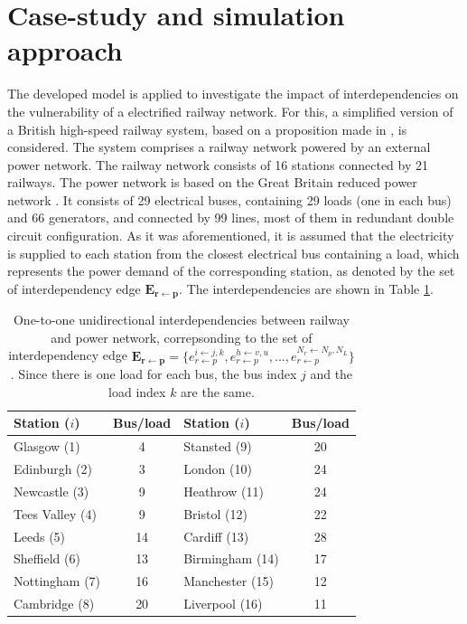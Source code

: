 \documentclass[review]{elsarticle}
\begin{document}
	\section{Case-study and simulation approach}
	The developed model is applied to investigate the impact of interdependencies on the vulnerability of a electrified railway network. For this, a simplified version of a British high-speed railway system, based on a proposition made in \cite{greengauge2009fast}, is considered. The system comprises a railway network powered by an external power network. The railway network consists of 16 stations connected by 21 railways. The power network is based on the Great Britain reduced power network \cite{bukhsh2013network}. It consists of 29 electrical buses, containing 29 loads (one in each bus) and 66 generators, and connected by 99 lines, most of them in redundant double circuit configuration. As it was aforementioned, it is assumed that the electricity is supplied to each station from the closest electrical bus containing a load, which represents the power demand of the corresponding station, as denoted by the set of interdependency edge $\mathbf{E_{r \leftarrow p}}$. The interdependencies are shown in Table \ref{interdependencies}.
	\begin{table}[h]
		\centering
		\caption{One-to-one unidirectional interdependencies between railway and power network, correpsonding to the set of interdependency edge $\mathbf{E_{r \leftarrow p}}=\{ e_{r \leftarrow p}^{i \leftarrow j,k}, e_{r \leftarrow p}^{h \leftarrow v,u},...,e_{r \leftarrow p}^{N_r \leftarrow N_p, N_L} \}$. Since there is one load for each bus, the bus index $j$ and the load index $k$ are the same.}
		\begin{tabular}[t]{lclc}
			\hline
			\textbf{Station ($i$)}& \textbf{Bus/load} & \textbf{Station ($i$)}& \textbf{Bus/load}\\
			\hline
			Glasgow (1) & 4 & Stansted (9) & 20 \\
			Edinburgh (2) & 3 & London (10) & 24\\
			Newcastle (3) & 9 &  Heathrow (11)  &  24\\
			Tees Valley (4) & 9 & Bristol (12) & 22\\
			Leeds (5) & 14 & Cardiff (13) & 28\\
			Sheffield (6) & 13 & Birmingham (14) & 17\\
			Nottingham (7) & 16 & Manchester (15) & 12\\
			Cambridge (8) & 20 & Liverpool (16) & 11\\
			\hline
		\end{tabular}
		\label{interdependencies}
	\end{table}%
\end{document}
